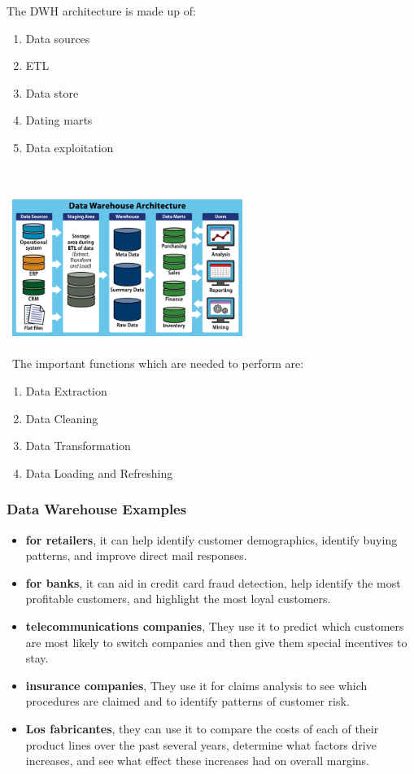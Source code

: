 \documentclass{article}
\begin{document}
\begin{multicols}{2}
The DWH architecture is made up of:
\begin{enumerate}
\item Data sources
\item ETL
\item Data store
\item Dating marts
\item Data exploitation
\end{enumerate}
\\\
\\\
\includegraphics[width=7.5cm]{images/dataWarehouse.png}
\\\
\\\
The important functions which are needed to perform are:
\begin{enumerate}
\item Data Extraction
\item Data Cleaning
\item Data Transformation
\item Data Loading and Refreshing
\end{enumerate}

\subsubsection {Data Warehouse Examples}
\begin{itemize}
\item \textbf{for retailers}, it can help identify customer demographics, identify buying patterns, and improve direct mail responses.
\item \textbf{for banks}, it can aid in credit card fraud detection, help identify the most profitable customers, and highlight the most loyal customers.
\item \textbf{telecommunications companies}, They use it to predict which customers are most likely to switch companies and then give them special incentives to stay.
\item \textbf{insurance companies}, They use it for claims analysis to see which procedures are claimed and to identify patterns of customer risk.
\item \textbf{Los fabricantes}, they can use it to compare the costs of each of their product lines over the past several years, determine what factors drive increases, and see what effect these increases had on overall margins.
\end{itemize}


\end{multicols}
\end{document}
